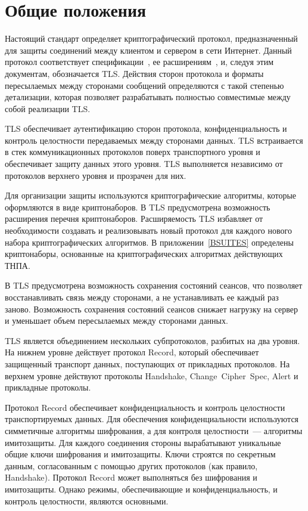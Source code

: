 \chapter{Общие положения}\label{COMMON}

Настоящий стандарт определяет криптографический протокол, предназначенный 
для защиты соединений между клиентом и сервером в сети Интернет. 
Данный протокол соответствует спецификации~\cite{RFC5246}, 
ее расширениям~\cite{RFC4279}, \cite{RFC5746}  и, следуя этим документам, 
обозначается TLS. Действия сторон протокола и форматы пересылаемых между 
сторонами сообщений определяются с такой степенью детализации, которая 
позволяет разрабатывать полностью совместимые между собой реализации TLS. 

TLS обеспечивает аутентификацию сторон протокола, конфиденциальность и 
контроль целостности передаваемых между сторонами данных. TLS 
встраивается в стек коммуникационных протоколов поверх транспортного 
уровня и обеспечивает защиту данных этого уровня. TLS выполняется 
независимо от протоколов верхнего уровня и прозрачен для них. 

Для организации защиты используются криптографические алгоритмы, которые 
оформляются в виде криптонаборов. В TLS предусмотрена возможность 
расширения перечня криптонаборов. Расширяемость TLS избавляет от 
необходимости создавать и реализовывать новый протокол для каждого нового 
набора криптографических алгоритмов. В приложении~\ref{BSUITES} определены 
криптонаборы, основанные на криптографических алгоритмах действующих ТНПА. 
  
В TLS предусмотрена возможность сохранения состояний сеансов, что 
позволяет восстанавливать связь между сторонами, а не устанавливать ее 
каждый раз заново. Возможность сохранения состояний сеансов снижает 
нагрузку на сервер и уменьшает объем пересылаемых между сторонами данных. 

TLS является объединением нескольких субпротоколов, разбитых на два 
уровня. На нижнем уровне действует протокол Record, который обеспечивает 
защищенный транспорт данных, поступающих от прикладных протоколов. На 
верхнем уровне действуют протоколы Handshake, Change~Cipher~Spec, Alert и 
прикладные протоколы. 

Протокол Record обеспечивает конфиденциальность и контроль целостности 
транспортируемых данных. Для обеспечения конфиденциальности используются 
симметичные алгоритмы шифрования, а для контроля целостности~--- алгоритмы 
имитозащиты. Для каждого соединения стороны вырабатывают уникальные общие 
ключи шифрования и имитозащиты. Ключи строятся по секретным данным, 
согласованным с помощью других протоколов (как правило, Handshake). 
Протокол Record может выполняться без шифрования и имитозащиты. Однако 
режимы, обеспечивающие и конфиденциальность, и контроль целостности, 
являются основными. 

